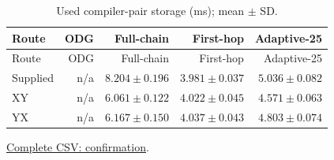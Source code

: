 \begin{center}\small
\begin{longtable}{lrrrr}
\caption{Used compiler-pair storage (ms); mean $\pm$ SD.}\\
\toprule
Route & ODG & Full-chain & First-hop & Adaptive-25 \\
\midrule\endfirsthead
\toprule
Route & ODG & Full-chain & First-hop & Adaptive-25 \\
\midrule\endhead
Supplied & n/a & $8.204 \pm 0.196$ & $3.981 \pm 0.037$ & $5.036 \pm 0.082$ \\
XY & n/a & $6.061 \pm 0.122$ & $4.022 \pm 0.045$ & $4.571 \pm 0.063$ \\
YX & n/a & $6.167 \pm 0.150$ & $4.037 \pm 0.043$ & $4.803 \pm 0.074$ \\
\bottomrule\end{longtable}\end{center}
{\footnotesize \href{https://github.com/sanjeevkrishnaa/Compiler-Driven-ACE/blob/codex/ace-scheduler-correctness/docs/latex/oct25_pre_golden/data/confirmation.csv}{Complete CSV: confirmation}. }
